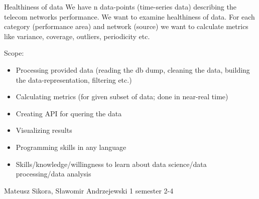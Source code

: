 \begin{project}
{Healthiness of data}
{We have n data-points (time-series data) describing the telecom networks performance. We want to examine healthiness of data. For each category (performance area) and network (source) we want to calculate metrics like variance, coverage, outliers, periodicity etc.} 
{
Scope:
\begin{itemize}
	\item Processing provided data (reading the db dump, cleaning the data, building the data-representation, filtering etc.)
	\item Calculating metrics (for given subset of data; done in near-real time)
	\item Creating API for quering the data
	\item Visualizing results
\end{itemize}
}
{
\begin{itemize}
	\item Programming skills in any language
	\item Skills/knowledge/willingness to learn about data science/data processing/data analysis
\end{itemize}
}
{Mateusz Sikora, Sławomir Andrzejewski}
{1 semester}
{2-4}
\end{project}

